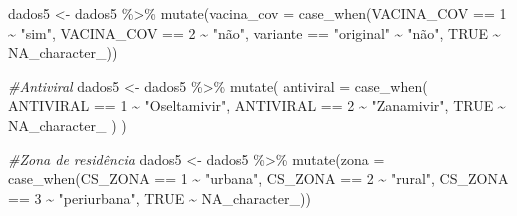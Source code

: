 \documentclass[
]{article}
\newenvironment{Shaded}{\begin{snugshade}}{\end{snugshade}}
\newcommand{\AttributeTok}[1]{\textcolor[rgb]{0.77,0.63,0.00}{#1}}
\newcommand{\CommentTok}[1]{\textcolor[rgb]{0.56,0.35,0.01}{\textit{#1}}}
\newcommand{\ConstantTok}[1]{\textcolor[rgb]{0.00,0.00,0.00}{#1}}
\newcommand{\DecValTok}[1]{\textcolor[rgb]{0.00,0.00,0.81}{#1}}
\newcommand{\FunctionTok}[1]{\textcolor[rgb]{0.00,0.00,0.00}{#1}}
\newcommand{\NormalTok}[1]{#1}
\newcommand{\OtherTok}[1]{\textcolor[rgb]{0.56,0.35,0.01}{#1}}
\newcommand{\SpecialCharTok}[1]{\textcolor[rgb]{0.00,0.00,0.00}{#1}}
\newcommand{\StringTok}[1]{\textcolor[rgb]{0.31,0.60,0.02}{#1}}
\begin{document}
\begin{Shaded}
\begin{Highlighting}[]
\NormalTok{dados5 }\OtherTok{\textless{}{-}}\NormalTok{  dados5 }\SpecialCharTok{\%\textgreater{}\%}
  \FunctionTok{mutate}\NormalTok{(}\AttributeTok{vacina\_cov =} \FunctionTok{case\_when}\NormalTok{(VACINA\_COV }\SpecialCharTok{==} \DecValTok{1} \SpecialCharTok{\textasciitilde{}} \StringTok{"sim"}\NormalTok{,}
\NormalTok{                            VACINA\_COV }\SpecialCharTok{==} \DecValTok{2} \SpecialCharTok{\textasciitilde{}} \StringTok{"não"}\NormalTok{,}
\NormalTok{                            variante }\SpecialCharTok{==} \StringTok{"original"} \SpecialCharTok{\textasciitilde{}} \StringTok{"não"}\NormalTok{,}
                            \ConstantTok{TRUE} \SpecialCharTok{\textasciitilde{}} \ConstantTok{NA\_character\_}\NormalTok{))}

\CommentTok{\#Antiviral}
\NormalTok{dados5 }\OtherTok{\textless{}{-}}\NormalTok{  dados5 }\SpecialCharTok{\%\textgreater{}\%}
  \FunctionTok{mutate}\NormalTok{(}
    \AttributeTok{antiviral =} \FunctionTok{case\_when}\NormalTok{(}
\NormalTok{      ANTIVIRAL }\SpecialCharTok{==} \DecValTok{1} \SpecialCharTok{\textasciitilde{}} \StringTok{"Oseltamivir"}\NormalTok{,}
\NormalTok{      ANTIVIRAL }\SpecialCharTok{==} \DecValTok{2} \SpecialCharTok{\textasciitilde{}} \StringTok{"Zanamivir"}\NormalTok{,}
      \ConstantTok{TRUE} \SpecialCharTok{\textasciitilde{}} \ConstantTok{NA\_character\_}
\NormalTok{    )}
\NormalTok{  )}

\CommentTok{\#Zona de residência}
\NormalTok{dados5 }\OtherTok{\textless{}{-}}\NormalTok{  dados5 }\SpecialCharTok{\%\textgreater{}\%}
  \FunctionTok{mutate}\NormalTok{(}\AttributeTok{zona =} \FunctionTok{case\_when}\NormalTok{(CS\_ZONA }\SpecialCharTok{==} \DecValTok{1} \SpecialCharTok{\textasciitilde{}} \StringTok{"urbana"}\NormalTok{,}
\NormalTok{                          CS\_ZONA }\SpecialCharTok{==} \DecValTok{2} \SpecialCharTok{\textasciitilde{}} \StringTok{"rural"}\NormalTok{,}
\NormalTok{                          CS\_ZONA }\SpecialCharTok{==} \DecValTok{3} \SpecialCharTok{\textasciitilde{}} \StringTok{"periurbana"}\NormalTok{,}
                                  \ConstantTok{TRUE} \SpecialCharTok{\textasciitilde{}} \ConstantTok{NA\_character\_}\NormalTok{))}



\end{Highlighting}
\end{Shaded}
\end{document}
